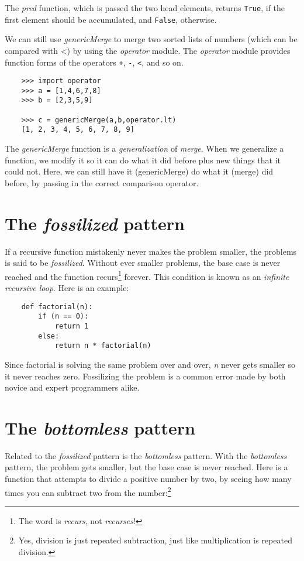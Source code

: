 The {\it pred} function, which is passed the two head elements, returns
\verb!True!, if the first element should be accumulated,
and \verb!False!, otherwise.

We can still use {\it genericMerge} to merge two sorted lists of numbers
(which can be compared with <) by using the {\it operator} module. The
{\it operator} module provides function forms of the
operators \verb!+!, \verb!-!,
\verb!<!, and so on.

\begin{verbatim}
    >>> import operator
    >>> a = [1,4,6,7,8]
    >>> b = [2,3,5,9]

    >>> c = genericMerge(a,b,operator.lt)
    [1, 2, 3, 4, 5, 6, 7, 8, 9]
\end{verbatim}

The {\it genericMerge} function is a {\it generalization} of {\it merge}.
When we generalize a function,  we modify it so it can do what it
did before plus new things that it could not. Here, we can still
have it (genericMerge) do what it (merge) did before, by passing
in the correct comparison operator.

\section{The {\it fossilized} pattern}

If a recursive function mistakenly never makes the problem
smaller, the problems is said to be {\it fossilized}.
Without ever smaller problems, the base case is never reached
and the function recurs\footnote{The word is {\it recurs}, not {\it recurses}!}
forever.
This condition is known as an
{\it infinite recursive loop}. Here is an example:

\begin{verbatim}
    def factorial(n):
        if (n == 0):
            return 1
        else:
            return n * factorial(n)
\end{verbatim}

Since factorial is solving the same problem over and over, {\it n}
never gets smaller so it never reaches zero.
Fossilizing the problem is a common error made by both novice
and expert programmers alike.

\section{The {\it bottomless} pattern}

Related to the {\it fossilized} pattern is the {\it bottomless} pattern.
With the {\it bottomless} pattern, the problem gets smaller, but the base
case is never reached. Here is a function that attempts to
divide a positive number by two, by seeing how many times
you can subtract two from the number:\footnote{
Yes, division is just repeated subtraction, just like
multiplication is repeated division.}

